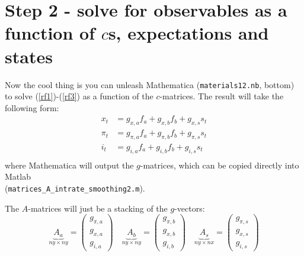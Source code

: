 \documentclass[11pt]{article}
\renewcommand{\[}{\begin{equation}}
\renewcommand{\]}{\end{equation}}
\begin{document}
\section{Step 2 - solve for observables as a function of $c$s, expectations and states}
Now the cool thing is you can unleash Mathematica (\texttt{materials12.nb}, bottom) to solve (\ref{rf1})-(\ref{rf3}) as a function of the $c$-matrices. The result will take the following form:
\begin{align}
x_t & = g_{x,a}f_a + g_{x,b}f_b + g_{x,s}s_t \\
\pi_t & = g_{\pi,a}f_a + g_{\pi,b}f_b + g_{\pi,s}s_t \\
i_t & = g_{i,a}f_a + g_{i,b}f_b + g_{i,s}s_t \\
\end{align}
where Mathematica will output the $g$-matrices, which can be copied directly into Matlab \\(\texttt{matrices\_A\_intrate\_smoothing2.m}).

The $A$-matrices will just be a stacking of the $g$-vectors:
\begin{equation}
\underbrace{A_a}_{ny \times ny} = \begin{pmatrix} g_{\pi,a} \\ g_{x,a} \\ g_{i,a}\end{pmatrix} \quad 
\underbrace{A_b}_{ny \times ny} = \begin{pmatrix} g_{\pi,b} \\ g_{x,b} \\ g_{i,b}\end{pmatrix} \quad 
\underbrace{A_s}_{ny \times nx} = \begin{pmatrix} g_{\pi,s} \\ g_{x,s} \\ g_{i,s}\end{pmatrix}
\end{equation}
\end{document}
